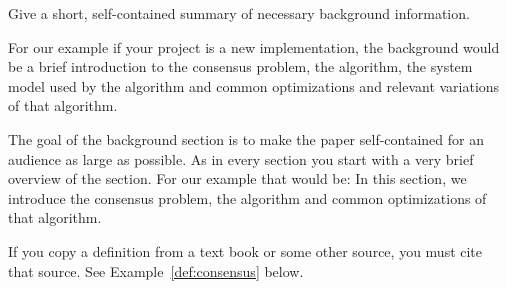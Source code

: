 Give a short, self-contained summary of necessary background
information. 

For our example if your project is a new \paxos implementation, the background
would be a brief introduction to the consensus problem, the \paxos algorithm,
the system model used by the \paxos algorithm
and common optimizations and relevant variations of that algorithm.

The goal of the background section is to make the paper 
self-contained for an audience as large as possible. As in every
section you start with a very brief overview of the section.
For our example that would be: In this section, we introduce the consensus problem,
the \paxos algorithm and common optimizations of that algorithm.

If you copy a definition from a text book or some other source, you must cite that source. 
See Example~\ref{def:consensus} below. 
